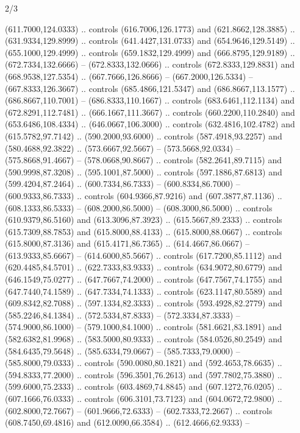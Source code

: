 \begin{flagdescription}{2/3}
\begin{scope}[xshift=0.5\flaglength,yshift=0.5\flagwidth,scale=\flagwidth/525.28]
\begin{scope}[y=0.1mm, x=0.1mm, yscale=-1,shift={(-381.5,-404)}]
\begin{scope}[shift={(5.25001,4.53053)},miter limit=4.00,line width=0.800\lw]
  (611.7000,124.0333) .. controls (616.7006,126.1773) and (621.8662,128.3885) ..
  (631.9334,129.8999) .. controls (641.4427,131.0733) and (654.9646,129.5149) ..
  (655.1000,129.4999) .. controls (659.1832,129.4999) and (666.8795,129.9189) ..
  (672.7334,132.6666) -- (672.8333,132.0666) .. controls (672.8333,129.8831) and
  (668.9538,127.5354) .. (667.7666,126.8666) -- (667.2000,126.5334) --
  (667.8333,126.3667) .. controls (685.4866,121.5347) and (686.8667,113.1577) ..
  (686.8667,110.7001) -- (686.8333,110.1667) .. controls (683.6461,112.1134) and
  (672.8291,112.7481) .. (666.1667,111.3667) .. controls (660.2200,110.2840) and
  (653.6486,108.4334) .. (646.0667,106.3000) .. controls (632.4816,102.4782) and
  (615.5782,97.7142) .. (590.2000,93.6000) .. controls (587.4918,93.2257) and
  (580.4688,92.3822) .. (573.6667,92.5667) -- (573.5668,92.0334) --
  (575.8668,91.4667) -- (578.0668,90.8667) .. controls (582.2641,89.7115) and
  (590.9998,87.3208) .. (595.1001,87.5000) .. controls (597.1886,87.6813) and
  (599.4204,87.2464) .. (600.7334,86.7333) -- (600.8334,86.7000) --
  (600.9333,86.7333) .. controls (604.9366,87.9216) and (607.3877,87.1136) ..
  (608.1333,86.5333) -- (608.2000,86.5000) -- (608.3000,86.5000) .. controls
  (610.9379,86.5160) and (613.3096,87.3923) .. (615.5667,89.2333) .. controls
  (615.7309,88.7853) and (615.8000,88.4133) .. (615.8000,88.0667) .. controls
  (615.8000,87.3136) and (615.4171,86.7365) .. (614.4667,86.0667) --
  (613.9333,85.6667) -- (614.6000,85.5667) .. controls (617.7200,85.1112) and
  (620.4485,84.5701) .. (622.7333,83.9333) .. controls (634.9072,80.6779) and
  (646.1549,75.0277) .. (647.7667,74.2000) .. controls (647.7567,74.1755) and
  (647.7440,74.1589) .. (647.7334,74.1333) .. controls (623.1147,80.5589) and
  (609.8342,82.7088) .. (597.1334,82.3333) .. controls (593.4928,82.2779) and
  (585.2246,84.1384) .. (572.5334,87.8333) -- (572.3334,87.3333) --
  (574.9000,86.1000) -- (579.1000,84.1000) .. controls (581.6621,83.1891) and
  (582.6382,81.9968) .. (583.5000,80.9333) .. controls (584.0526,80.2549) and
  (584.6435,79.5648) .. (585.6334,79.0667) -- (585.7333,79.0000) --
  (585.8000,79.0333) .. controls (590.0080,80.1821) and (592.4653,78.6635) ..
  (594.8333,77.2000) .. controls (596.3501,76.2613) and (597.7802,75.3880) ..
  (599.6000,75.2333) .. controls (603.4869,74.8845) and (607.1272,76.0205) ..
  (607.1666,76.0333) .. controls (606.3101,73.7123) and (604.0672,72.9800) ..
  (602.8000,72.7667) -- (601.9666,72.6333) -- (602.7333,72.2667) .. controls
  (608.7450,69.4816) and (612.0090,66.3584) .. (612.4666,62.9333) --

\end{scope}
\end{scope}
\end{scope}
\end{flagdescription}
